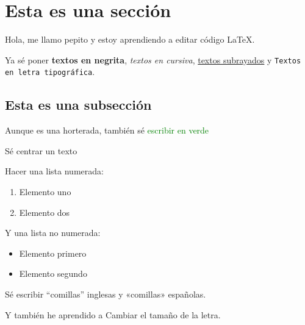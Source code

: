 \documentclass[a4paper,10pt]{article}
\title{}
\author{}
\date{}
\begin{document}
\section{Esta es una sección}

Hola, me llamo pepito y estoy aprendiendo a editar código \LaTeX.

Ya sé poner \textbf{textos en negrita}, \textit{textos en cursiva}, \underline{textos subrayados} y \texttt{Textos en letra tipográfica}.

\subsection{Esta es una subsección}

Aunque es una horterada, también sé \textcolor{green}{escribir en verde}

\begin{center}
Sé centrar un texto
\end{center}

Hacer una lista numerada:

\begin{enumerate}
\item Elemento uno 
\item Elemento dos
\end{enumerate}

Y una lista no numerada:

\begin{itemize}
\item Elemento primero
\item Elemento segundo
\end{itemize}

Sé escribir ``comillas'' inglesas y «comillas» españolas.

Y también he aprendido a \huge{Cambiar el tamaño de la letra.}
\end{document}
